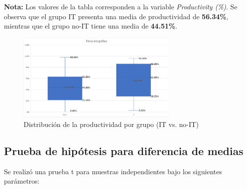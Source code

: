 \vspace{0.5cm}

\noindent
\textbf{Nota:} Los valores de la tabla corresponden a la variable \textit{Productivity (\%)}. Se observa que el grupo IT presenta una media de productividad de \textbf{56.34\%}, mientras que el grupo no-IT tiene una media de \textbf{44.51\%}.

\begin{figure}[H]
    \centering
    \includegraphics[width=0.7\textwidth]{assets/Boxplot.png}
    \caption{Distribución de la productividad por grupo (IT vs. no-IT)}
\end{figure}

\subsection{Prueba de hipótesis para diferencia de medias}

Se realizó una prueba t para muestras independientes bajo los siguientes parámetros:

